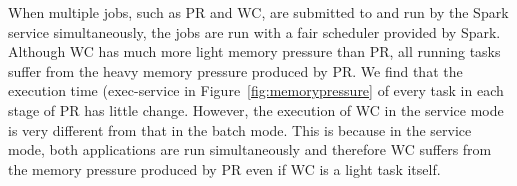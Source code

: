
When multiple jobs, such as PR and WC, are submitted to and run by the Spark 
service simultaneously, the jobs are run with a fair scheduler provided by Spark. 
Although WC has much more light memory pressure than PR, all running tasks  
suffer from the heavy memory pressure produced by PR. We find that the execution time 
(exec-service in Figure~\ref{fig:memorypressure} of every task in each stage of PR has little change.
However, the execution of WC in the service mode is very different from that in the batch mode. This is because in the service mode, both applications are run simultaneously and therefore WC suffers from the memory pressure produced by PR even if WC is a
light task itself. 


